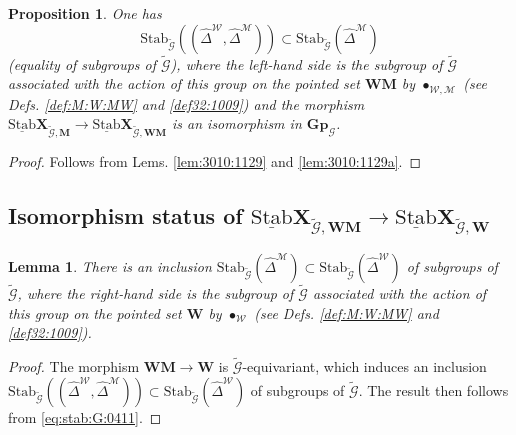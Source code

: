 \documentclass[10pt]{amsart}
\newtheorem{lem}[thm]{Lemma}
\newtheorem{prop}[thm]{Proposition}
\numberwithin{equation}{subsection}
\begin{document}
\begin{prop}\label{prop:4:10:nov}
One has 
\begin{equation}\label{eq:stab:G:0411}
   \mathrm{Stab}_{\tilde{\mathcal G}}((\hat\Delta^{\mathcal W},\hat\Delta^{\mathcal M}))
\subset\mathrm{Stab}_{\tilde{\mathcal G}}(\hat\Delta^{\mathcal M}) 
\end{equation}
(equality of subgroups of $\tilde{\mathcal G}$), where the left-hand side is 
the subgroup of $\tilde{\mathcal G}$ associated with the action of this group on the pointed set $\mathbf W\mathbf M$ by 
$\bullet_{\mathcal W,\mathcal M}$ (see Defs. \ref{def:M:W:MW} and \ref{def32:1009}) and 
the morphism $\underline{\mathrm{Stab}}\mathbf X_{\tilde{\mathcal G},\mathbf M}\to\underline{\mathrm{Stab}}\mathbf X_{\tilde{\mathcal G},\mathbf{WM}}$
    is an isomorphism in $\mathbf{Gp}_{\mathcal G}$. 
\end{prop}

\begin{proof}
  Follows from Lems. \ref{lem:3010:1129} and \ref{lem:3010:1129a}. 
\end{proof}


\subsection{Isomorphism status of $\underline{\mathrm{Stab}}\mathbf X_{\tilde{\mathcal G},\mathbf{WM}}\to
\underline{\mathrm{Stab}}\mathbf X_{\tilde{\mathcal G},\mathbf W}$}\label{sect:4:3:5786}

\begin{lem}\label{lem:4:11:411}
There is an inclusion $\mathrm{Stab}_{\tilde{\mathcal G}}(\hat\Delta^{\mathcal M})
\subset\mathrm{Stab}_{\tilde{\mathcal G}}(\hat\Delta^{\mathcal W})$ of subgroups of $\tilde{\mathcal G}$, where
the right-hand side is the subgroup of $\tilde{\mathcal G}$ associated with the action of this group on the pointed set $\mathbf W$ by 
$\bullet_{\mathcal W}$ (see Defs. \ref{def:M:W:MW} and \ref{def32:1009}).
\end{lem}

\begin{proof}
The morphism $\mathbf{WM}\to\mathbf{W}$ is $\tilde{\mathcal G}$-equivariant, which induces an inclusion 
$\mathrm{Stab}_{\tilde{\mathcal G}}((\hat\Delta^{\mathcal W},\hat\Delta^{\mathcal M}))
\subset\mathrm{Stab}_{{\tilde{\mathcal G}}}(\hat\Delta^{\mathcal W})$ of subgroups of ${\tilde{\mathcal G}}$. 
The result then follows from \eqref{eq:stab:G:0411}. 
\end{proof}
\end{document}
